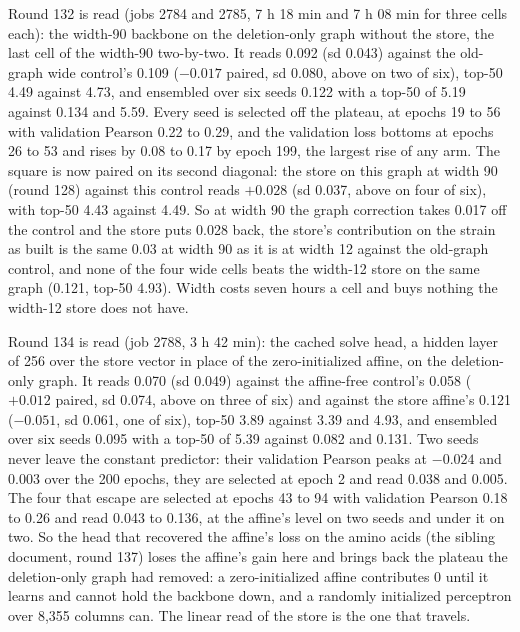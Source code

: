 Round 132 is read (jobs 2784 and 2785, 7 h 18 min and 7 h 08 min for three cells
each): the width-90 backbone on the deletion-only graph without the store, the last
cell of the width-90 two-by-two. It reads 0.092 (sd 0.043) against the old-graph wide
control's 0.109 ($-0.017$ paired, sd 0.080, above on two of six), top-50 4.49 against
4.73, and ensembled over six seeds 0.122 with a top-50 of 5.19 against 0.134 and 5.59.
Every seed is selected off the plateau, at epochs 19 to 56 with validation Pearson 0.22
to 0.29, and the validation loss bottoms at epochs 26 to 53 and rises by 0.08 to 0.17
by epoch 199, the largest rise of any arm. The square is now paired on its second
diagonal: the store on this graph at width 90 (round 128) against this control reads
$+0.028$ (sd 0.037, above on four of six), with top-50 4.43 against 4.49. So at width
90 the graph correction takes 0.017 off the control and the store puts 0.028 back, the
store's contribution on the strain as built is the same 0.03 at width 90 as it is at
width 12 against the old-graph control, and none of the four wide cells beats the
width-12 store on the same graph (0.121, top-50 4.93). Width costs seven hours a cell
and buys nothing the width-12 store does not have.

Round 134 is read (job 2788, 3 h 42 min): the cached solve head, a hidden layer of 256
over the store vector in place of the zero-initialized affine, on the deletion-only
graph. It reads 0.070 (sd 0.049) against the affine-free control's 0.058 ($+0.012$
paired, sd 0.074, above on three of six) and against the store affine's 0.121
($-0.051$, sd 0.061, one of six), top-50 3.89 against 3.39 and 4.93, and ensembled over
six seeds 0.095 with a top-50 of 5.39 against 0.082 and 0.131. Two seeds never leave the
constant predictor: their validation Pearson peaks at $-0.024$ and 0.003 over the 200
epochs, they are selected at epoch 2 and read 0.038 and 0.005. The four that escape are
selected at epochs 43 to 94 with validation Pearson 0.18 to 0.26 and read 0.043 to
0.136, at the affine's level on two seeds and under it on two. So the head that
recovered the affine's loss on the amino acids (the sibling document, round 137) loses
the affine's gain here and brings back the plateau the deletion-only graph had removed:
a zero-initialized affine contributes 0 until it learns and cannot hold the backbone
down, and a randomly initialized perceptron over 8,355 columns can. The linear read of
the store is the one that travels.

